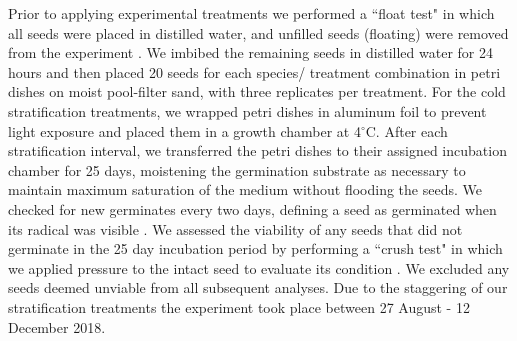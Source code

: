 \documentclass{article}[11pt]
\begin{document}
\noindent  Prior to applying experimental treatments we performed a ``float test" in which all seeds were placed in distilled water, and unfilled seeds (floating) were removed from the experiment \citep{Baskin2014}. We imbibed the remaining seeds in distilled water for 24 hours and then placed 20 seeds for each species/ treatment combination in petri dishes on moist pool-filter sand, with three replicates per treatment. For the cold stratification treatments, we wrapped petri dishes in aluminum foil to prevent light exposure and placed them in a growth chamber at 4$^{\circ}$C. After each stratification interval, we transferred the petri dishes to their assigned incubation chamber for 25 days, moistening the germination substrate as necessary to maintain maximum saturation of the medium without flooding the seeds. We checked for new germinates every two days, defining a seed as germinated when its radical was visible \citep{Baskin2014}. We assessed the viability of any seeds that did not germinate in the 25 day incubation period by performing a ``crush test" in which we applied pressure to the intact seed to evaluate its condition \citep{Baskin2014}. We excluded any seeds deemed unviable from all subsequent analyses. Due to the staggering of our stratification treatments the experiment took place between 27 August - 12 December 2018.
\end{document}
